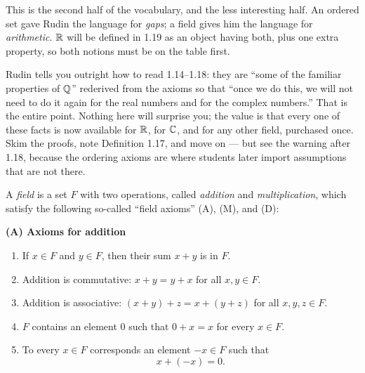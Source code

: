 
\begin{signpost}
This is the second half of the vocabulary, and the less interesting half. An
ordered set gave Rudin the language for \emph{gaps}; a field gives him the
language for \emph{arithmetic}. $\mathbb{R}$ will be defined in 1.19 as an object having
both, plus one extra property, so both notions must be on the table first.

\smallskip
Rudin tells you outright how to read 1.14--1.18: they are ``some of the familiar
properties of $\mathbb{Q}$'' rederived from the axioms so that ``once we do this, we
will not need to do it again for the real numbers and for the complex numbers.''
That is the entire point. Nothing here will surprise you; the value is that
every one of these facts is now available for $\mathbb{R}$, for $\mathbb{C}$, and for any other
field, purchased once. Skim the proofs, note Definition 1.17, and move on ---
but see the warning after 1.18, because the ordering axioms are where students
later import assumptions that are not there.
\end{signpost}

A \emph{field} is a set $F$ with two operations, called \emph{addition} and
\emph{multiplication}, which satisfy the following so-called ``field axioms''
(A), (M), and (D):

\smallskip
\noindent\textbf{(A) Axioms for addition}
\begin{enumerate}[label=(A\arabic*), leftmargin=3.1em, itemsep=2pt, topsep=3pt]
  \item If $x \in F$ and $y \in F$, then their sum $x+y$ is in $F$.
  \item Addition is commutative: $x + y = y + x$ for all $x, y \in F$.
  \item Addition is associative: $(x+y)+z = x+(y+z)$ for all $x,y,z \in F$.
  \item $F$ contains an element $0$ such that $0 + x = x$ for every $x \in F$.
  \item To every $x \in F$ corresponds an element $-x \in F$ such that
        \[ x + (-x) = 0. \]
\end{enumerate}

